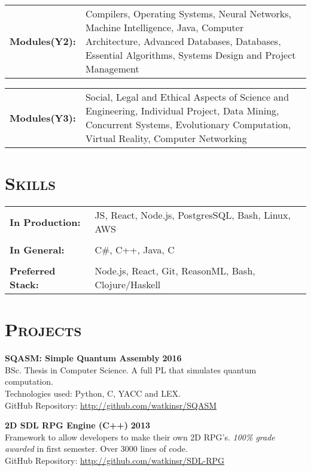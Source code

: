 \documentclass[line, margin, 10pt]{res}
\begin{document}
\begin{resume}
\begin{tabular}[t]{@{} p{1.2in} p{3.75in} @{}}  
\bf{Modules(Y2):}  & Compilers,
  Operating Systems,
  Neural Networks,
  Machine Intelligence,
  Java,
  Computer Architecture,
  Advanced Databases,
  Databases,
  Essential Algorithms,
  Systems Design and Project Management
\end{tabular}

\begin{tabular}[t]{@{} p{1.2in} p{3.75in} @{}}  
\bf{Modules(Y3):}  & Social, Legal and Ethical Aspects of Science and Engineering,
  Individual Project,
  Data Mining,
  Concurrent Systems,  
  Evolutionary Computation,
  Virtual Reality,
  Computer Networking
\end{tabular}

\section{\textsc{Skills}}
   \begin{tabular}[t]{@{} p{1.2in} p{3.75in} @{}}
     \bf{In Production:} & JS, React, Node.js, PostgresSQL, Bash, Linux, AWS \\
    \\
    \bf{In General:} & C\#, C++, Java, C  \\
    \\
    \bf{Preferred Stack:} & Node.js, React, Git, ReasonML, Bash, Clojure/Haskell \\
 \end{tabular}

\section{\textsc{Projects}}

{\bf SQASM: Simple Quantum Assembly} {\bf \hfill 2016}\\
BSc. Thesis in Computer Science. A full PL that simulates quantum computation.\\ Technologies used: Python, C, YACC and LEX.\\ 
GitHub Repository: \url{http://github.com/watkinsr/SQASM}

{\bf 2D SDL RPG Engine (C++)} {\bf \hfill 2013}\\
Framework to allow developers to make their own 2D RPG's. \textit{100\% grade awarded} in first semester. Over 3000 lines of code.  \\
GitHub Repository: \url{http://github.com/watkinsr/SDL-RPG}


\end{resume}
\end{document}
